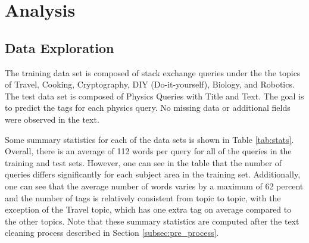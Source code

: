 \documentclass{article}
\begin{document}
\section{Analysis}

\subsection{Data Exploration}




The training data set is composed of stack exchange queries under the the
topics of Travel, Cooking, Cryptography, DIY (Do-it-yourself), 
Biology, and Robotics. The test data set is composed of Physics Queries with
Title and Text. The goal is to predict the tags for each physics query. No
missing data or additional fields were observed in the text. 

Some summary statistics for each of the data sets is shown in Table
\ref{tab:stats}. Overall, there is an average of 112 words per query for all
of the queries in the training and test sets. However, one can see in the
table that the number of queries differs significantly for each subject area
in the training set. Additionally, one can see that the average number of
words varies by a maximum of 62 percent and the number of tags is relatively
consistent from topic to topic, with the exception of the Travel topic, which
has one extra tag on average compared to the other topics. Note that these
summary statistics are computed after the text cleaning process described in
Section \ref{subsec:pre_process}.
 
\end{document}
